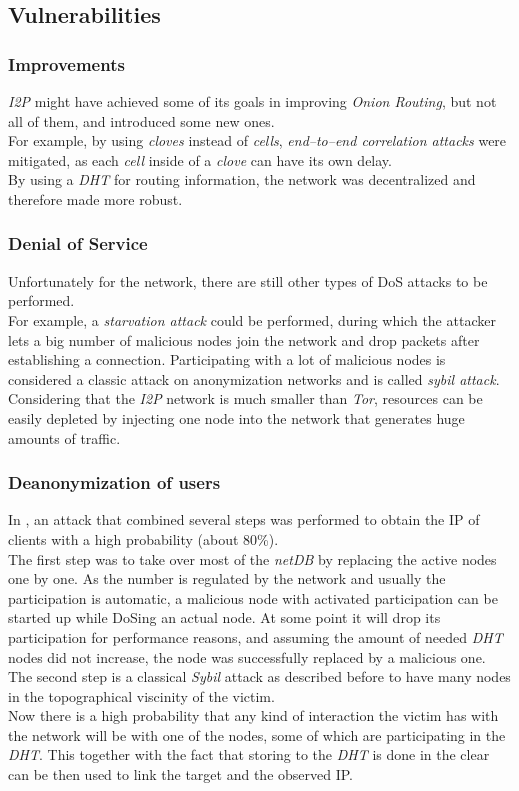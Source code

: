 \documentclass{sig-alternate}
\begin{document}
\subsection{Vulnerabilities}
\subsubsection{Improvements}
\emph{I2P} might have achieved some of its goals in improving \emph{Onion Routing}, but not all of them, and introduced some new ones.
\\
For example, by using \emph{cloves} instead of \emph{cells}, \emph{end--to--end correlation attacks} were mitigated, as each \emph{cell} inside of a \emph{clove} can have its own delay.
\\
By using a \emph{DHT} for routing information, the network was decentralized and therefore made more robust\cite{zantout2011}.

\subsubsection{Denial of Service}
Unfortunately for the network, there are still other types of DoS attacks to be performed.
\\
For example, a \emph{starvation attack} could be performed, during which the attacker lets a big number of malicious nodes join the network and drop packets after establishing a connection.
Participating with a lot of malicious nodes is considered a classic attack on anonymization networks and is called \emph{sybil attack}.
\\
Considering that the \emph{I2P} network is much smaller than \emph{Tor}, resources can be easily depleted by injecting one node into the network that generates huge amounts of traffic\cite{zantout2011}.

\subsubsection{Deanonymization of users}
In \cite{egger2013}, an attack that combined several steps was performed to obtain the IP of clients with a high probability (about 80\%).
\\
The first step was to take over most of the \emph{netDB} by replacing the active nodes one by one.
As the number is regulated by the network and usually the participation is automatic, a malicious node with activated participation can be started up while DoSing an actual node.
At some point it will drop its participation for performance reasons, and assuming the amount of needed \emph{DHT} nodes did not increase, the node was successfully replaced by a malicious one.
\\
The second step is a classical \emph{Sybil} attack as described before to have many nodes in the topographical viscinity of the victim.
\\
Now there is a high probability that any kind of interaction the victim has with the network will be with one of the nodes, some of which are participating in the \emph{DHT}.
This together with the fact that storing to the \emph{DHT} is done in the clear can be then used to link the target and the observed IP.
\end{document}
